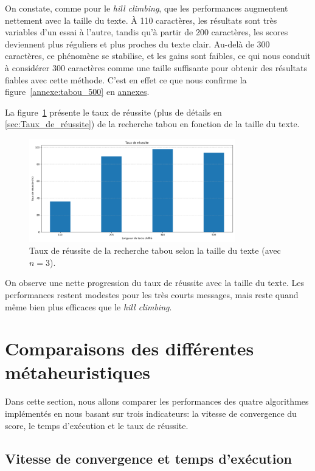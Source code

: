 \documentclass[a4paper]{article}
\begin{document}
On constate, comme pour le \textit{hill climbing}, que les performances augmentent nettement avec la taille du texte. À 110 caractères, les résultats sont très variables d’un essai à l’autre, tandis qu’à partir de 200 caractères, les scores deviennent plus réguliers et plus proches du texte clair. Au-delà de 300 caractères, ce phénomène se stabilise, et les gains sont faibles, ce qui nous conduit à considérer 300 caractères comme une taille suffisante pour obtenir des résultats fiables avec cette méthode. C'est en effet ce que nous confirme la figure~\ref{annexe:tabou_500} en \hyperref[sec:annexes]{annexes}.

\medskip

La figure~\ref{fig:tabou_taux} présente le taux de réussite (plus de détails en \ref{sec:Taux_de_réussite}) de la recherche tabou en fonction de la taille du texte.

\begin{figure}[H]
    \centering
    \includegraphics[width=0.8\textwidth]{taux_reussite_tabou.png}
    \caption{Taux de réussite de la recherche tabou selon la taille du texte (avec $n = 3$).}
    \label{fig:tabou_taux}
\end{figure}

On observe une nette progression du taux de réussite avec la taille du texte. Les performances restent modestes pour les très courts messages, mais reste quand même bien plus efficaces que le \textit{hill climbing}.

\section{Comparaisons des différentes métaheuristiques}
\label{sec:comparaison_meta}
Dans cette section, nous allons comparer les performances des quatre algorithmes implémentés en nous basant sur trois indicateurs: la vitesse de convergence du score, le temps d’exécution et le taux de réussite.

\subsection{Vitesse de convergence et temps d'exécution}
\end{document}
